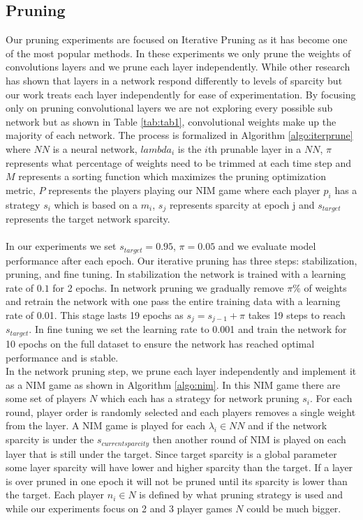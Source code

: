 \documentclass{article}
\begin{document}
\subsection{Pruning}
Our pruning experiments are focused on Iterative Pruning as it has become one of the most popular methods. In these experiments we only prune the weights of convolutions layers and we prune each layer independently. While other research has shown that layers in a network respond differently to levels of sparcity but our work treats each layer independently for ease of experimentation. By focusing only on pruning convolutional layers we are not exploring every possible sub network but as shown in Table \ref{tab:tab1}, convolutional weights make up the majority of each network. The process is formalized in Algorithm \ref{algo:iterprune} where $NN$ is a neural network, $lambda_i$ is the $i$th prunable layer in a $NN$, $\pi$ represents what percentage of weights need to be trimmed at each time step and $M$ represents a sorting function which maximizes the pruning optimization metric, $P$ represents the players playing our NIM game where each player $p_i$ has a strategy $s_i$ which is based on a $m_i$, $s_j$ represents sparcity at epoch j and $s_{target}$ represents the target network sparcity. \\ \\
In our experiments we set $s_{target} = 0.95$, $\pi=0.05$ and we evaluate model performance after each epoch. Our iterative pruning has three steps: stabilization, pruning, and fine tuning. In stabilization the network is trained with a learning rate of $0.1$ for 2 epochs. In network pruning we gradually remove $\pi\%$ of  weights and retrain the network with one pass the entire training data with a learning rate of 0.01. This stage lasts 19 epochs as $s_j = s_{j-1} + \pi$ takes 19 steps to reach $s_{target}$. In fine tuning we set the learning rate to 0.001 and train the network for 10 epochs on the full dataset to ensure the network has reached optimal performance and is stable. \\
In the network pruning step, we prune each layer independently and implement it as a NIM game as shown in Algorithm \ref{algo:nim}. In this NIM game there are some set of players $N$ which each has a strategy for network pruning $s_i$. For each round, player order is randomly selected and each players removes a single weight from the layer. A NIM game is played for each $\lambda_i \in NN$ and if the network sparcity is under the $s_{current sparcity}$ then another round of NIM is played on each layer that is still under the target. Since target sparcity is a global parameter some layer sparcity will have lower and higher sparcity than the target. If a layer is over pruned in one epoch it will not be pruned until its sparcity is lower than the target.  Each player $n_i \in N$ is defined by what pruning strategy is used and while our experiments focus on 2 and 3 player games $N$ could be much bigger. \\
\end{document}
